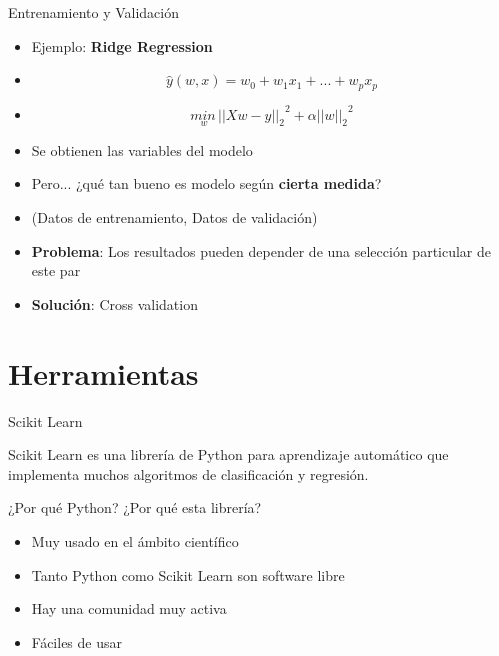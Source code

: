 \documentclass[10pt]{beamer}
\begin{document}
\begin{frame}{Entrenamiento y Validación}

  \begin{itemize}[<+->]
  \item Ejemplo: \textbf{Ridge Regression}

  \item[] $$\hat{y}(w, x) = w_0 + w_1 x_1 + ... + w_p x_p$$

  \item[] $$\underset{w}{min\,}{{||X w - y||_2}}^2 + \alpha{||w||_2}^2$$

  \item Se obtienen las variables del modelo

  \item Pero... ¿qué tan bueno es modelo según \textbf{cierta medida}?

  \item (Datos de entrenamiento, Datos de validación) 

  \item \textbf{Problema}: Los resultados pueden depender de una selección particular de
    este par

  \item \textbf{Solución}: Cross validation

  \end{itemize}
\end{frame}

\section{Herramientas}

\begin{frame}{Scikit Learn}

  Scikit Learn es una librería de Python para aprendizaje automático que
  implementa muchos algoritmos de clasificación y regresión.

  ¿Por qué Python? ¿Por qué esta librería?

  \begin{itemize}[<+->]
  \item Muy usado en el ámbito científico
  \item Tanto Python como Scikit Learn son software libre
  \item Hay una comunidad muy activa
  \item Fáciles de usar
  \end{itemize}


\end{frame}
\end{document}
